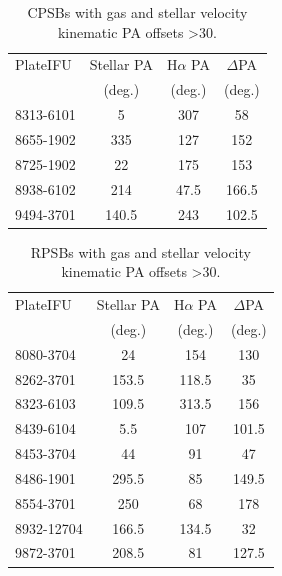 \begin{table}
\centering
\caption{CPSBs with gas and stellar velocity kinematic PA offsets \textgreater 30\textdegree.}
\label{tab:offsetCPSBs}
\begin{tabular}{lccc}
\hline
PlateIFU  & Stellar PA & H$\alpha$ PA & $\Delta$PA \\
  & (deg.) & (deg.) & (deg.) \\
\hline
8313-6101 & 5 & 307 & 58 \\
8655-1902 & 335 & 127 & 152 \\
8725-1902 & 22 & 175 & 153 \\
8938-6102 & 214 & 47.5 & 166.5 \\
9494-3701 & 140.5 & 243 & 102.5 \\
\hline
\end{tabular}
\end{table}

\begin{table}
\centering
\caption[RPSBs with kinematic velocity PA offsets \textgreater 30\textdegree.]{RPSBs with gas and stellar velocity kinematic PA offsets \textgreater 30\textdegree.}
\label{tab:offsetRPSBs}
\begin{tabular}{lccc}
\hline
PlateIFU   & Stellar PA & H$\alpha$ PA & $\Delta$PA \\
  & (deg.) & (deg.) & (deg.) \\
\hline
8080-3704 & 24 & 154 & 130 \\
8262-3701 & 153.5 & 118.5 & 35 \\
8323-6103 & 109.5 & 313.5 & 156 \\
8439-6104 & 5.5 & 107 & 101.5 \\
8453-3704 & 44 & 91 & 47 \\
8486-1901 & 295.5 & 85 & 149.5 \\
8554-3701 & 250 & 68 & 178 \\
8932-12704 & 166.5 & 134.5 & 32 \\
9872-3701 & 208.5 & 81 & 127.5 \\
\hline
\end{tabular}
\end{table}

